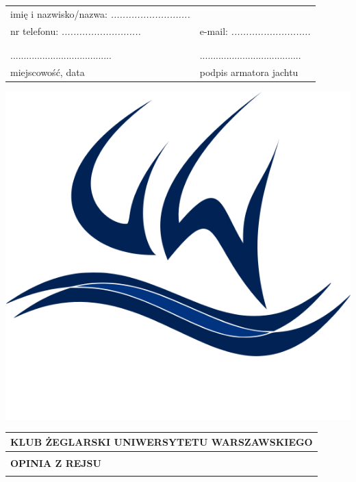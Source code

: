 \documentclass{article}
\begin{document}
\begin{tabularx}{\textwidth}{X X}
imię i nazwisko/nazwa: \textit{...........................} \\
nr telefonu: \textit{...........................} & e-mail: \textit{...........................}\\
\\\\
...................................... & ......................................\\
miejscowość, data & podpis armatora jachtu\\
\end{tabularx}
\newpage
\begin{minipage}{0.11\textwidth}
\includegraphics[width=\textwidth]{logo.png}
\end{minipage}
\begin{minipage}{0.89\textwidth}
\begin{tabularx}{\textwidth} { 
  | >{\centering\arraybackslash}X | }
 \hline
 \textbf{KLUB ŻEGLARSKI UNIWERSYTETU WARSZAWSKIEGO} \\
 \hline
 \\
 \textbf{\huge OPINIA Z REJSU} \\
 \\
\hline
\end{tabularx}
\end{minipage}
\end{document}
